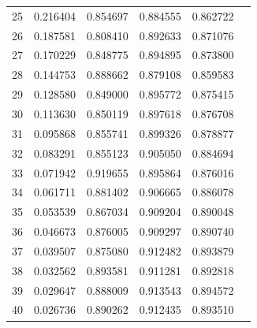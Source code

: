 \begin{table}[ht]
{\begin{tabular}{c c c c c c}
25 & 0.216404 & 0.854697 & 0.884555 & 0.862722 \\
26 & 0.187581 & 0.808410 & 0.892633 & 0.871076 \\
27 & 0.170229 & 0.848775 & 0.894895 & 0.873800 \\
28 & 0.144753 & 0.888662 & 0.879108 & 0.859583 \\
29 & 0.128580 & 0.849000 & 0.895772 & 0.875415 \\
30 & 0.113630 & 0.850119 & 0.897618 & 0.876708 \\
31 & 0.095868 & 0.855741 & 0.899326 & 0.878877 \\
32 & 0.083291 & 0.855123 & 0.905050 & 0.884694 \\
33 & 0.071942 & 0.919655 & 0.895864 & 0.876016 \\
34 & 0.061711 & 0.881402 & 0.906665 & 0.886078 \\
35 & 0.053539 & 0.867034 & 0.909204 & 0.890048 \\
36 & 0.046673 & 0.876005 & 0.909297 & 0.890740 \\
37 & 0.039507 & 0.875080 & 0.912482 & 0.893879 \\
38 & 0.032562 & 0.893581 & 0.911281 & 0.892818 \\
39 & 0.029647 & 0.888009 & 0.913543 & 0.894572 \\
40 & 0.026736 & 0.890262 & 0.912435 & 0.893510 \\
\hline
\end{tabular}
}
\end{table}

